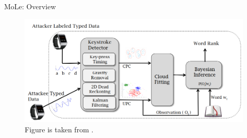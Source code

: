 \documentclass[ucs,9pt]{beamer}
\begin{document}
\begin{frame}{MoLe: Overview}
	\begin{figure}
	\centering
	\includegraphics[width=1\linewidth]{imgs/moleOverview}
	\caption{Figure is taken from \cite{b1}.}
	\end{figure}
	
	
	
	

\end{frame}
\end{document}
